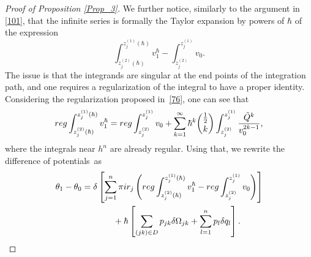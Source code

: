 \documentclass[10pt,a4paper]{article}
\numberwithin{equation}{section}
\theoremstyle{definition}
\begin{document}
\begin{proof}[Proof of Proposition \ref{Prop_3}]
We further notice, similarly to the argument in \eqref{101}, that the infinite series is formally the Taylor expansion by powers of $\hbar$ of the expression
\begin{equation*}%
\int^{z^{(1)}_j(\hbar)}_{z^{(2)}_j(\hbar)}v^\hbar_1 - \int^{z^{(1)}_j}_{z^{(2)}_j}v_0 .
\end{equation*}
The issue is that the integrands are singular at the end points of the integration path, and one requires a regularization of the integral to have a proper identity.
Considering the regularization proposed in~\eqref{76}, one can see that
\begin{equation*}%
{\rm reg}\int^{z^{(1)}_j(\hbar)}_{z^{(2)}_j(\hbar)}v^\hbar_1 ={\rm reg}\int^{z^{(1)}_j}_{z^{(2)}_j}v_0 + \sum^{\infty}_{k=1}\hbar^k \binom{\frac{1}{2}}{k}\int^{z^{(1)}_j}_{z^{(2)}_j}\frac{\tilde{Q}^k}{v_0^{2k-1}} ,
\end{equation*}
where the integrals near $h^n$ are already regular.
Using that, we rewrite the difference of potentials~as
\begin{gather}
\theta_1- \theta_0=\delta\left[\sum^n_{j=1}
\pi {\rm i} r_j \left({\rm reg}\int^{z^{(1)}_j(\hbar)}_{z^{(2)}_j(\hbar)}v^\hbar_1 - {\rm reg}\int^{z^{(1)}_j}_{z^{(2)}_j}v_0 \right)\right] \nonumber\\
\hphantom{\theta_1- \theta_0=}{}
+ \hbar \left[\sum_{(jk) \in D}p_{jk} \delta \Omega_{jk}+ \sum^n_{l=1} p_l \delta q_l \right].\label{129}
 \end{gather}


\end{proof}
\end{document}
